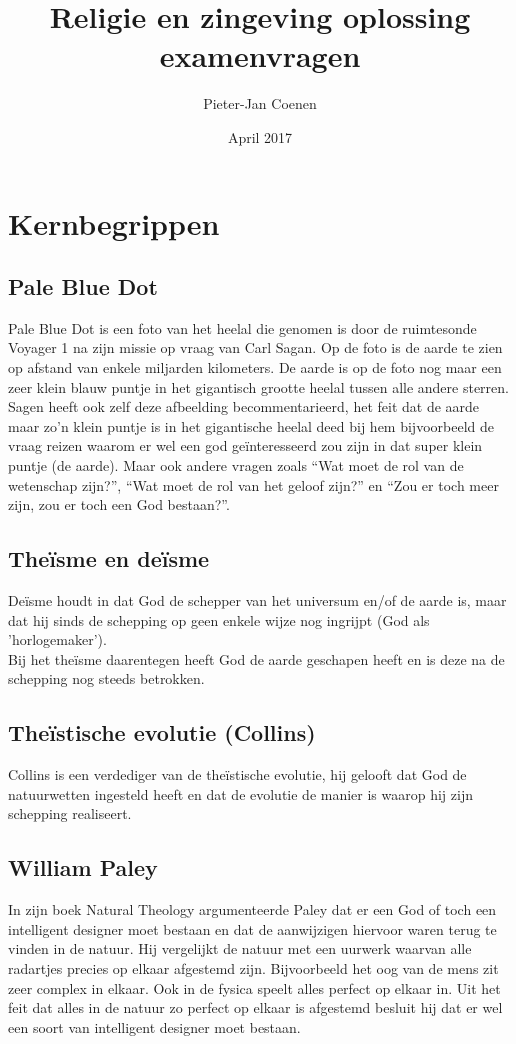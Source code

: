 \documentclass[11pt,a4paper,titlepage]{article}
\title{Religie en zingeving oplossing examenvragen}
\author{Pieter-Jan Coenen}
\date{April 2017}
\begin{document}
\maketitle
\newpage
\tableofcontents
\newpage

\section{Kernbegrippen}
\subsection{Pale Blue Dot}
Pale Blue Dot is een foto van het heelal die genomen is door de ruimtesonde Voyager 1 na zijn missie op vraag van Carl Sagan. Op de foto is de aarde te zien op afstand van enkele miljarden kilometers. De aarde is op de foto nog maar een zeer klein blauw puntje in het gigantisch grootte heelal tussen alle andere sterren.\\
Sagen heeft ook zelf deze afbeelding becommentarieerd, het feit dat de aarde maar zo'n klein puntje is in het gigantische heelal deed bij hem bijvoorbeeld de vraag reizen waarom er wel een god geïnteresseerd zou zijn in dat super klein puntje (de aarde). Maar ook andere vragen zoals ``Wat moet de rol van de wetenschap zijn?'', ``Wat moet de rol van het geloof zijn?''  en ``Zou er toch meer zijn, zou er toch een God bestaan?''.
\subsection{Theïsme en deïsme}
Deïsme houdt in dat God de schepper van het universum en/of de aarde is, maar dat hij sinds de schepping op geen enkele wijze nog ingrijpt (God als 'horlogemaker').\\ Bij het theïsme daarentegen heeft God de aarde geschapen heeft en is deze na de schepping nog steeds betrokken.
\subsection{Theïstische evolutie (Collins)}
Collins is een verdediger van de theïstische evolutie, hij gelooft dat God de natuurwetten ingesteld heeft en dat de evolutie de manier is waarop hij zijn schepping realiseert.
\subsection{William Paley}
In zijn boek Natural Theology argumenteerde Paley dat er een God of toch een intelligent designer moet bestaan en dat de aanwijzigen hiervoor waren terug te vinden in de natuur. Hij vergelijkt de natuur met een uurwerk waarvan alle radartjes precies op elkaar afgestemd zijn. Bijvoorbeeld het oog van de mens zit zeer complex in elkaar.  Ook in de fysica speelt alles perfect op elkaar in. Uit het feit dat alles in de natuur zo perfect op elkaar is afgestemd besluit hij dat er wel een soort van intelligent designer moet bestaan.
\end{document}

